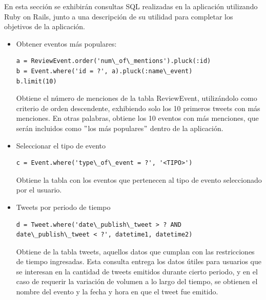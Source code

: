 \documentclass{memoria}
\begin{document}
En esta sección se exhibirán consultas SQL realizadas en la aplicación utilizando Ruby on Rails, junto a una descripción de su utilidad para completar los objetivos de la aplicación.
\begin{itemize}
\item Obtener eventos más populares:
\begin{verbatim}
a = ReviewEvent.order('num\_of\_mentions').pluck(:id)
b = Event.where('id = ?', a).pluck(:name\_event)
b.limit(10)
\end{verbatim}
Obtiene el número de menciones de la tabla ReviewEvent, utilizándolo como criterio de orden descendente, exhibiendo solo los 10 primeros tweets con más menciones. En otras palabras, obtiene los 10 eventos con más menciones, que serán incluidos como $"$los más populares$"$ dentro de la aplicación.

\item Seleccionar el tipo de evento
\begin{verbatim}
c = Event.where('type\_of\_event = ?', '<TIPO>')
\end{verbatim}
Obtiene la tabla con los eventos que pertenecen al tipo de evento seleccionado por el usuario. 

\item Tweets por periodo de tiempo
\begin{verbatim}
d = Tweet.where('date\_publish\_tweet > ? AND 
date\_publish\_tweet < ?', datetime1, datetime2)
\end{verbatim}
Obtiene de la tabla tweets, aquellos datos que cumplan con las restricciones de tiempo ingresadas. Esta consulta entrega los datos útiles para usuarios que se interesan en la cantidad de tweets emitidos durante cierto periodo, y en el caso de requerir la variación de volumen a lo largo del tiempo, se obtienen el nombre del evento y la fecha y hora en que el tweet fue emitido.


\end{itemize}
\end{document}
